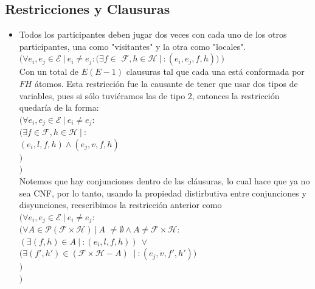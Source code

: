 \documentclass[a4paper,10pt]{article}
\newcommand{\tab}{\hspace*{0.5cm}}
\begin{document}
  \subsection{Restricciones y Clausuras}
    \begin{itemize}
      \item Todos los participantes deben jugar dos veces con cada uno de los 
      otros participantes, una como "visitantes" y la otra como "locales". \\

      $(\forall e_i, e_j \in \mathcal{E} \: | \: e_i \neq e_j : (\exists f \in$
      $ \mathcal{F}, h \in \mathcal{H} \: | \: : (e_i, e_j, f, h)) \: )$ \\

      Con un total de $E(E-1)$ clausuras tal que cada una est\'a conformada 
      por $FH$ \'atomos. Esta restricci\'on fue la causante de tener que usar
      dos tipos de variables, pues si s\'olo tuvi\'eramos las de tipo 2, entonces 
      la restricci\'on quedar\'ia de la forma:\\ 

      $(\forall e_i, e_j \in \mathcal{E} \: | \: e_i \neq e_j : $\\
      \tab $(\exists f \in \mathcal{F}, h \in \mathcal{H} \: | \: : $\\
      \tab \tab $ (e_i, l, f, h) \wedge (e_j, v, f, h) $ \\
      \tab $)$ \\
      $)$ \\

      Notemos que hay conjunciones dentro de las cl\'ausuras, lo cual hace que 
      ya no sea CNF, por lo tanto, usando la propiedad distirbutiva entre 
      conjunciones y disyunciones, reescribimos la restricci\'on anterior como\\

      $(\forall e_i, e_j \in \mathcal{E} \: | \: e_i \neq e_j : $\\
      \tab $(\forall A \in \mathcal{P}(\mathcal{F} \times \mathcal{H}) \: | \: A $
      $\neq \emptyset \wedge A \neq \mathcal{F} \times \mathcal{H}: $\\
      \tab \tab $(\exists (f, h) \in A \: | \: : (e_i, l, f, h)) \: \vee$ \\ 
      \tab \tab $(\exists (f', h') \in (\mathcal{F} \times \mathcal{H} - A) \: $
      $| \: : (e_j, v, f', h'))$\\
      \tab $)$\\
      $)$\\


\end{itemize}
\end{document}
